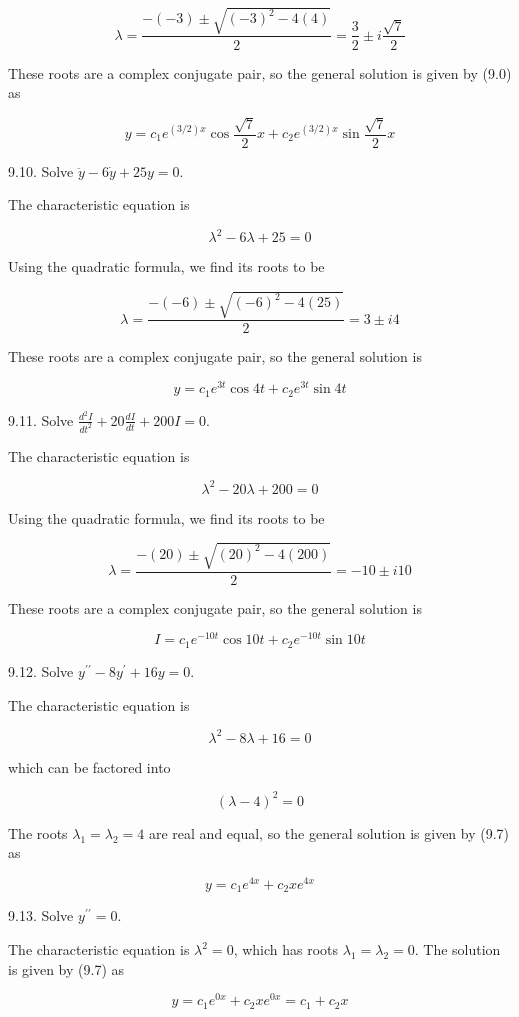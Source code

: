 \documentclass[10pt]{article}
\begin{document}
$$
\lambda=\frac{-(-3) \pm \sqrt{(-3)^{2}-4(4)}}{2}=\frac{3}{2} \pm i \frac{\sqrt{7}}{2}
$$

These roots are a complex conjugate pair, so the general solution is given by (9.0) as

$$
y=c_{1} e^{(3 / 2) x} \cos \frac{\sqrt{7}}{2} x+c_{2} e^{(3 / 2) x} \sin \frac{\sqrt{7}}{2} x
$$

9.10. Solve $\ddot{y}-6 \dot{y}+25 y=0$.

The characteristic equation is

$$
\lambda^{2}-6 \lambda+25=0
$$

Using the quadratic formula, we find its roots to be

$$
\lambda=\frac{-(-6) \pm \sqrt{(-6)^{2}-4(25)}}{2}=3 \pm i 4
$$

These roots are a complex conjugate pair, so the general solution is

$$
y=c_{1} e^{3 t} \cos 4 t+c_{2} e^{3 t} \sin 4 t
$$

9.11. Solve $\frac{d^{2} I}{d t^{2}}+20 \frac{d I}{d t}+200 I=0$.

The characteristic equation is

$$
\lambda^{2}-20 \lambda+200=0
$$

Using the quadratic formula, we find its roots to be

$$
\lambda=\frac{-(20) \pm \sqrt{(20)^{2}-4(200)}}{2}=-10 \pm i 10
$$

These roots are a complex conjugate pair, so the general solution is

$$
I=c_{1} e^{-10 t} \cos 10 t+c_{2} e^{-10 t} \sin 10 t
$$

9.12. Solve $y^{\prime \prime}-8 y^{\prime}+16 y=0$.

The characteristic equation is

$$
\lambda^{2}-8 \lambda+16=0
$$

which can be factored into

$$
(\lambda-4)^{2}=0
$$

The roots $\lambda_{1}=\lambda_{2}=4$ are real and equal, so the general solution is given by (9.7) as

$$
y=c_{1} e^{4 x}+c_{2} x e^{4 x}
$$

9.13. Solve $y^{\prime \prime}=0$.

The characteristic equation is $\lambda^{2}=0$, which has roots $\lambda_{1}=\lambda_{2}=0$. The solution is given by (9.7) as

$$
y=c_{1} e^{0 x}+c_{2} x e^{0 x}=c_{1}+c_{2} x
$$
\end{document}
